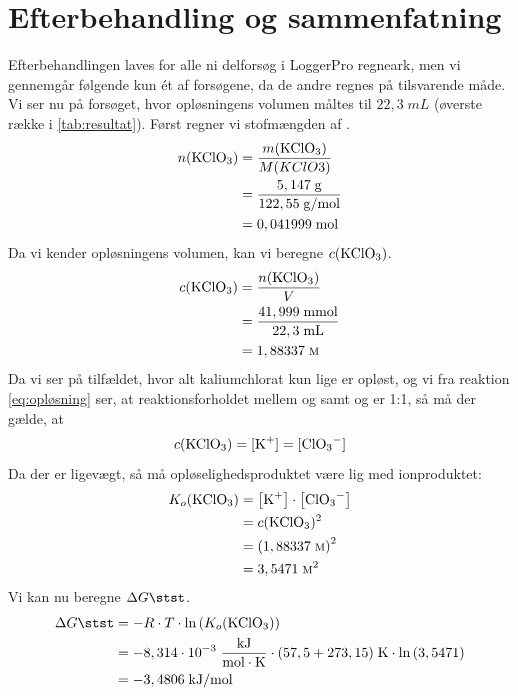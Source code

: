 \documentclass{report}
\begin{document}
\section*{Efterbehandling og sammenfatning}
Efterbehandlingen laves for alle ni delforsøg i LoggerPro regneark, men vi gennemgår følgende kun ét af forsøgene, da de andre regnes på tilsvarende måde.
Vi ser nu på forsøget, hvor opløsningens volumen måltes til $22,3 \;\unit{mL} $ (øverste række i \cref{tab:resultat}).
Først regner vi stofmængden af .
\begin{equation*}
\begin{split}
  n(\ce{KClO3} )&=\frac{m(\ce{KClO3} )}{M(KClO3)}\\
  &=\frac{5,147 \;\unit{g} }{122,55 \;\unit{g/mol} }\\
  &=0,041999 \;\unit{mol} 
\end{split}
\end{equation*}
Da vi kender opløsningens volumen, kan vi beregne $c(\ce{KClO3} )$.
\begin{equation*}
\begin{split}
  c(\ce{KClO3} )&=\frac{n(\ce{KClO3} )}{V}\\
  &=\frac{41,999 \;\unit{mmol} }{22,3 \;\unit{mL} }\\
  &=1,88337 \;\unit{\textsc{m}} 
\end{split}
\end{equation*}
Da vi ser på tilfældet, hvor alt kaliumchlorat kun lige er opløst, og vi fra reaktion \ref{eq:opløsning} ser, at reaktionsforholdet mellem  og  samt  og  er 1:1, så må der gælde, at
\[
c(\ce{KClO3} )=[\ce{K+} ]=[\ce{ClO3-} ]
\] 
Da der er ligevægt, så må opløselighedsproduktet være lig med ionproduktet:
\begin{equation*}
\begin{split}
  K_o(\ce{KClO3} )&=\left[\ce{K+} \right] \cdot \left[\ce{ClO3-} \right]\\
  &=c(\ce{KClO3} )^2\\
  &=\left(1,88337 \;\unit{\textsc{m}} \right)^2\\
  &=3,5471 \;\unit{\textsc{m}^2} 
\end{split}
\end{equation*}
Vi kan nu beregne $\Delta G \stst $.
\begin{equation*}
\begin{split}
  \Delta G \stst &=-R \cdot T \cdot \ln\left(K_o(\ce{KClO3} )\right)  \\
  &=-8,314 \cdot 10 ^{-3} \;\unit{\frac{kJ}{mol \cdot K}} \cdot (57,5 + 273,15) \;\unit{K} \cdot \ln\left(3,5471\right) \\
  &=-3,4806 \;\unit{kJ/mol} 
\end{split}
\end{equation*}
\end{document}
